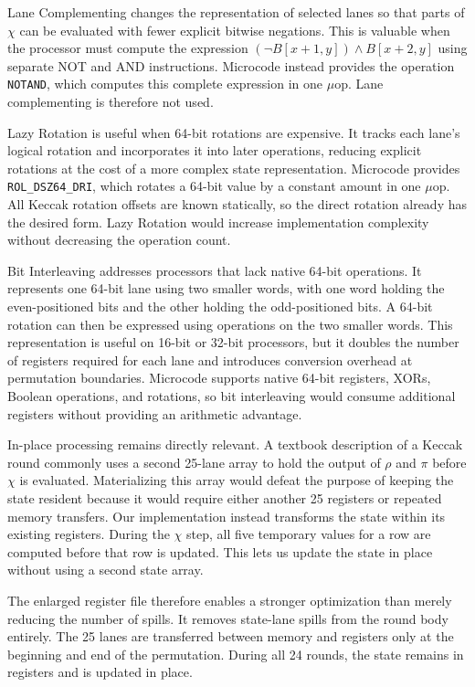 \documentclass[journal=tches,submission]{iacrtrans}
\newcommand{\code}[1]{\texttt{#1}}
\begin{document}
Lane Complementing changes the representation of selected lanes so that parts of $\chi$ can be evaluated with fewer explicit bitwise negations.
This is valuable when the processor must compute the expression $(\lnot B[x+1,y])\land B[x+2,y]$ using separate NOT and AND instructions.
Microcode instead provides the operation \code{NOTAND}, which computes this complete expression in one $\mu$op.
Lane complementing is therefore not used.

Lazy Rotation is useful when 64-bit rotations are expensive.
It tracks each lane's logical rotation and incorporates it into later operations, reducing explicit rotations at the cost of a more complex state representation.
Microcode provides \code{ROL\_DSZ64\_DRI}, which rotates a 64-bit value by a constant amount in one $\mu$op.
All Keccak rotation offsets are known statically, so the direct rotation already has the desired form.
Lazy Rotation would increase implementation complexity without decreasing the operation count.

Bit Interleaving addresses processors that lack native 64-bit operations.
It represents one 64-bit lane using two smaller words, with one word holding the even-positioned bits and the other holding the odd-positioned bits.
A 64-bit rotation can then be expressed using operations on the two smaller words.
This representation is useful on 16-bit or 32-bit processors, but it doubles the number of registers required for each lane and introduces conversion overhead at permutation boundaries.
Microcode supports native 64-bit registers, XORs, Boolean operations, and rotations, so bit interleaving would consume additional registers without providing an arithmetic advantage.

In-place processing remains directly relevant.
A textbook description of a Keccak round commonly uses a second 25-lane array to hold the output of $\rho$ and $\pi$ before $\chi$ is evaluated.
Materializing this array would defeat the purpose of keeping the state resident because it would require either another 25 registers or repeated memory transfers.
Our implementation instead transforms the state within its existing registers.
During the $\chi$ step, all five temporary values for a row are computed before that row is updated.
This lets us update the state in place without using a second state array.

The enlarged register file therefore enables a stronger optimization than merely reducing the number of spills.
It removes state-lane spills from the round body entirely.
The 25 lanes are transferred between memory and registers only at the beginning and end of the permutation.
During all 24 rounds, the state remains in registers and is updated in place.
\end{document}
